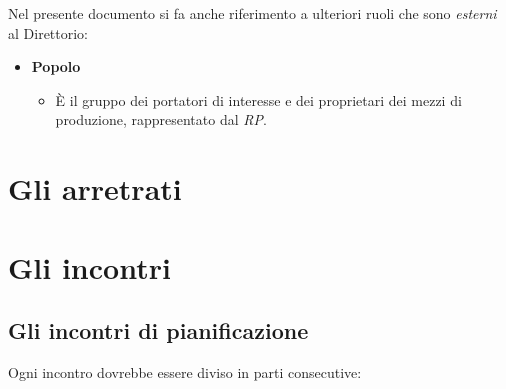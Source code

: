 Nel presente documento si fa anche riferimento a ulteriori ruoli che sono \textit{esterni} al Direttorio:
\begin{itemize}
\item \textbf{Popolo}
  \begin{itemize}
    \item \`E il gruppo dei portatori di interesse e dei proprietari dei mezzi di produzione, rappresentato dal \textit{RP}.
  \end{itemize}
\end{itemize}

\section{Gli arretrati}


\section{Gli incontri}

\subsection{Gli incontri di pianificazione}

Ogni incontro dovrebbe essere diviso in parti consecutive:

